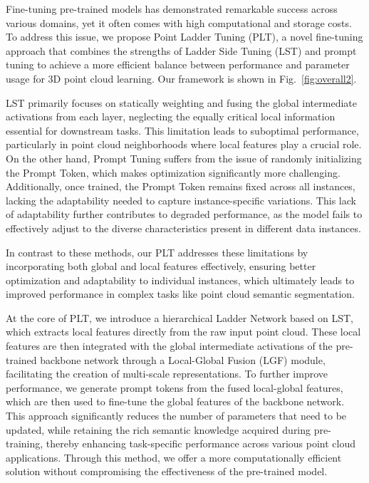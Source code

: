 Fine-tuning pre-trained models has demonstrated remarkable success across various domains, yet it often comes with high computational and storage costs. To address this issue, we propose Point Ladder Tuning (PLT), a novel fine-tuning approach that combines the strengths of Ladder Side Tuning (LST) and prompt tuning to achieve a more efficient balance between performance and parameter usage for 3D point cloud learning. 
Our framework is shown in Fig.~\ref{fig:overall2}.

LST primarily focuses on statically weighting and fusing the global intermediate activations from each layer, neglecting the equally critical local information essential for downstream tasks. This limitation leads to suboptimal performance, particularly in point cloud neighborhoods where local features play a crucial role. On the other hand, Prompt Tuning suffers from the issue of randomly initializing the Prompt Token, which makes optimization significantly more challenging. Additionally, once trained, the Prompt Token remains fixed across all instances, lacking the adaptability needed to capture instance-specific variations. This lack of adaptability further contributes to degraded performance, as the model fails to effectively adjust to the diverse characteristics present in different data instances.

In contrast to these methods, our PLT addresses these limitations by incorporating both global and local features effectively, ensuring better optimization and adaptability to individual instances, which ultimately leads to improved performance in complex tasks like point cloud semantic segmentation.

At the core of PLT, we introduce a hierarchical Ladder Network based on LST, which extracts local features directly from the raw input point cloud. These local features are then integrated with the global intermediate activations of the pre-trained backbone network through a Local-Global Fusion (LGF) module, facilitating the creation of multi-scale representations. To further improve performance, we generate prompt tokens from the fused local-global features, which are then used to fine-tune the global features of the backbone network. This approach significantly reduces the number of parameters that need to be updated, while retaining the rich semantic knowledge acquired during pre-training, thereby enhancing task-specific performance across various point cloud applications. Through this method, we offer a more computationally efficient solution without compromising the effectiveness of the pre-trained model.



